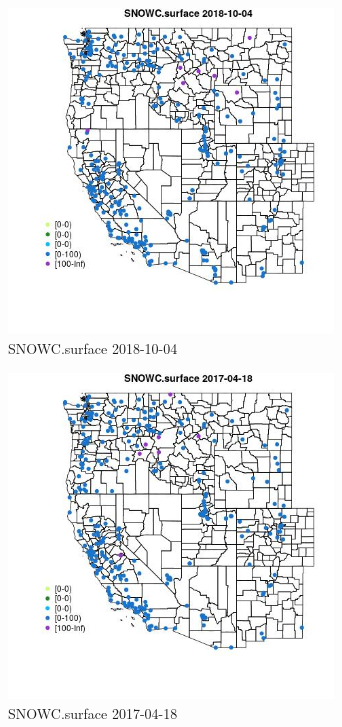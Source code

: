 \begin{figure} 
\centering  
\includegraphics[width=0.77\textwidth]{Code_Outputs/Report_ML_input_PM25_Step4_part_f_de_duplicated_aveswNAs_MapObsSNOWCsurface2018-10-04.jpg} 
\caption{\label{fig:Report_ML_input_PM25_Step4_part_f_de_duplicated_aveswNAsMapObsSNOWCsurface2018-10-04}SNOWC.surface 2018-10-04} 
\end{figure} 
 

\begin{figure} 
\centering  
\includegraphics[width=0.77\textwidth]{Code_Outputs/Report_ML_input_PM25_Step4_part_f_de_duplicated_aveswNAs_MapObsSNOWCsurface2017-04-18.jpg} 
\caption{\label{fig:Report_ML_input_PM25_Step4_part_f_de_duplicated_aveswNAsMapObsSNOWCsurface2017-04-18}SNOWC.surface 2017-04-18} 
\end{figure} 
 

